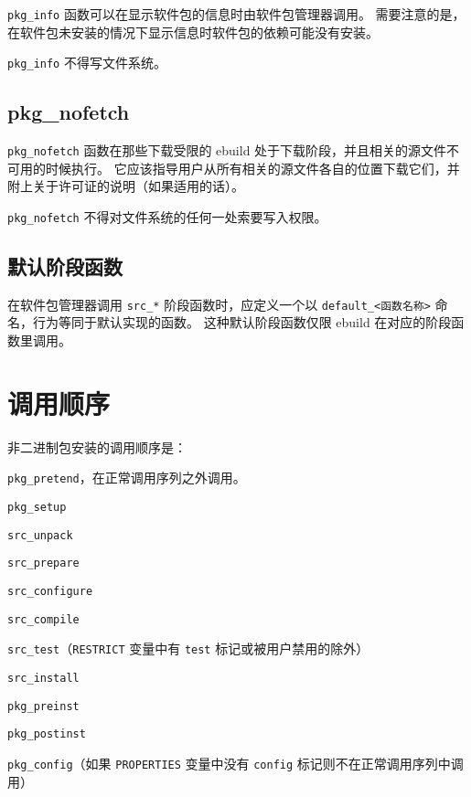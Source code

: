 \texttt{pkg_info} 函数可以在显示软件包的信息时由软件包管理器调用。
需要注意的是，在软件包未安装的情况下显示信息时软件包的依赖可能没有安装。

\texttt{pkg_info} 不得写文件系统。

\subsection{pkg_nofetch}

\texttt{pkg_nofetch} 函数在那些下载受限的 ebuild 处于下载阶段，并且相关的源文件不可用的时候执行。
它应该指导用户从所有相关的源文件各自的位置下载它们，并附上关于许可证的说明（如果适用的话）。

\texttt{pkg_nofetch} 不得对文件系统的任何一处索要写入权限。

\subsection{默认阶段函数}
\label{sec:default-phase-funcs}

在软件包管理器调用 \texttt{src_*} 阶段函数时，应定义一个以
\texttt{default_<\hspace{0em}函数名称\hspace{0em}>} 命名，行为等同于默认实现的函数。
这种默认阶段函数仅限 ebuild 在对应的阶段函数里调用。

\section{调用顺序}

非二进制包安装的调用顺序是：
\begin{compactitem}
\item \texttt{pkg_pretend}，在正常调用序列之外调用。
\item \texttt{pkg_setup}
\item \texttt{src_unpack}
\item \texttt{src_prepare}
\item \texttt{src_configure}
\item \texttt{src_compile}
\item \texttt{src_test}（\texttt{RESTRICT} 变量中有 \texttt{test} 标记或被用户禁用的除外）
\item \texttt{src_install}
\item \texttt{pkg_preinst}
\item \texttt{pkg_postinst}
\item \texttt{pkg_config}（如果 \texttt{PROPERTIES} 变量中没有 \texttt{config} 标记则不在正常调用序列中调用）
\end{compactitem}

